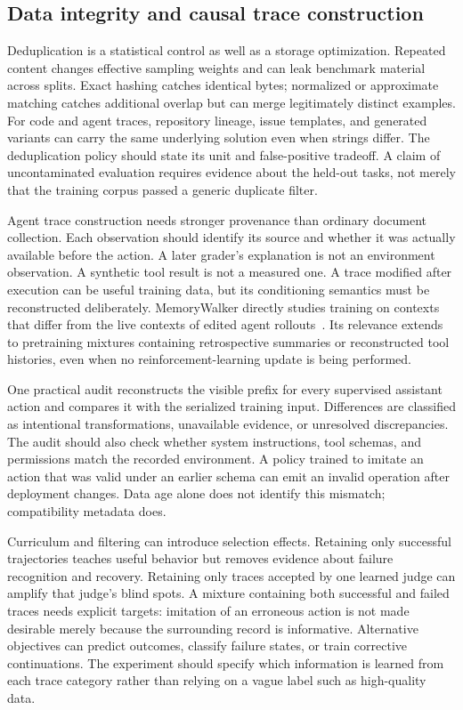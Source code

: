 \subsection{Data integrity and causal trace construction}
\label{sec:C07:data}
Deduplication is a statistical control as well as a storage optimization. Repeated content changes effective sampling weights and can leak benchmark material across splits. Exact hashing catches identical bytes; normalized or approximate matching catches additional overlap but can merge legitimately distinct examples. For code and agent traces, repository lineage, issue templates, and generated variants can carry the same underlying solution even when strings differ. The deduplication policy should state its unit and false-positive tradeoff. A claim of uncontaminated evaluation requires evidence about the held-out tasks, not merely that the training corpus passed a generic duplicate filter.

Agent trace construction needs stronger provenance than ordinary document collection. Each observation should identify its source and whether it was actually available before the action. A later grader's explanation is not an environment observation. A synthetic tool result is not a measured one. A trace modified after execution can be useful training data, but its conditioning semantics must be reconstructed deliberately. MemoryWalker directly studies training on contexts that differ from the live contexts of edited agent rollouts~\cite{j2026memorywalker}. Its relevance extends to pretraining mixtures containing retrospective summaries or reconstructed tool histories, even when no reinforcement-learning update is being performed.

One practical audit reconstructs the visible prefix for every supervised assistant action and compares it with the serialized training input. Differences are classified as intentional transformations, unavailable evidence, or unresolved discrepancies. The audit should also check whether system instructions, tool schemas, and permissions match the recorded environment. A policy trained to imitate an action that was valid under an earlier schema can emit an invalid operation after deployment changes. Data age alone does not identify this mismatch; compatibility metadata does.

Curriculum and filtering can introduce selection effects. Retaining only successful trajectories teaches useful behavior but removes evidence about failure recognition and recovery. Retaining only traces accepted by one learned judge can amplify that judge's blind spots. A mixture containing both successful and failed traces needs explicit targets: imitation of an erroneous action is not made desirable merely because the surrounding record is informative. Alternative objectives can predict outcomes, classify failure states, or train corrective continuations. The experiment should specify which information is learned from each trace category rather than relying on a vague label such as high-quality data.

